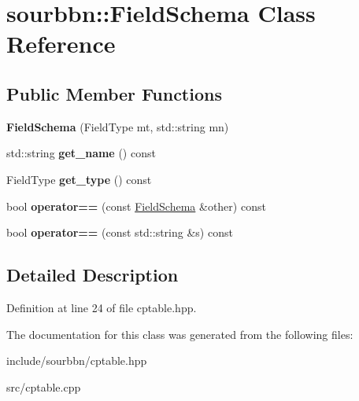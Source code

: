 \hypertarget{classsourbbn_1_1FieldSchema}{}\section{sourbbn\+:\+:Field\+Schema Class Reference}
\label{classsourbbn_1_1FieldSchema}
\subsection*{Public Member Functions}
\begin{DoxyCompactItemize}
\item 
\mbox{\label{classsourbbn_1_1FieldSchema_a18964de27fa3ed6e1609af7f1762c5d2}} 
{\bfseries Field\+Schema} (Field\+Type mt, std\+::string mn)
\item 
\mbox{\label{classsourbbn_1_1FieldSchema_aebe466cbf3b8435f662aa5d20f1c920e}} 
std\+::string {\bfseries get\+\_\+name} () const
\item 
\mbox{\label{classsourbbn_1_1FieldSchema_a3b6c653ab6409221f757e56e1df10c9e}} 
Field\+Type {\bfseries get\+\_\+type} () const
\item 
\mbox{\label{classsourbbn_1_1FieldSchema_a9c0632a1857f34907bdc95338dca1589}} 
bool {\bfseries operator==} (const \hyperlink{classsourbbn_1_1FieldSchema}{Field\+Schema} \&other) const
\item 
\mbox{\label{classsourbbn_1_1FieldSchema_a2fe79d2a7f8d8c8bbbbfac798f396301}} 
bool {\bfseries operator==} (const std\+::string \&s) const
\end{DoxyCompactItemize}


\subsection{Detailed Description}


Definition at line 24 of file cptable.\+hpp.



The documentation for this class was generated from the following files\+:\begin{DoxyCompactItemize}
\item 
include/sourbbn/cptable.\+hpp\item 
src/cptable.\+cpp\end{DoxyCompactItemize}
